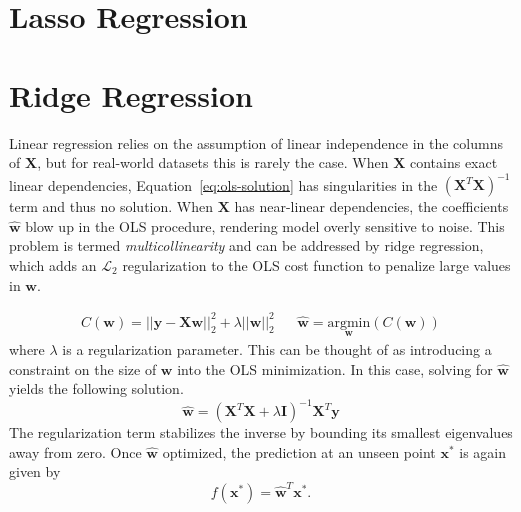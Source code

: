 \documentclass[11pt]{article}
\begin{document}
\section{Lasso Regression}
\newpage
\section*{Ridge Regression} 
Linear regression relies on the assumption of linear independence in the
columns of $\mathbf{X}$, but for real-world datasets this is rarely the case.
When $\mathbf{X}$ contains exact linear dependencies,
Equation~\ref{eq:ols-solution} has singularities in the
$(\mathbf{X}^T\mathbf{X})^{-1}$ term and thus no solution.  
When $\mathbf{X}$ has near-linear dependencies, the coefficients
$\hat{\mathbf{w}}$ blow up in the OLS procedure, rendering model overly
sensitive to noise. 
This problem is termed {\it multicollinearity} and can be addressed by ridge
regression, which adds an $\mathcal{L}_2$ regularization to the OLS cost
function to penalize large values in $\mathbf{w}$.

\begin{align}
	C(\mathbf{w}) 
= 
	|| 
		\mathbf{y} 
	- 
		\mathbf{X} 
		\mathbf{w} 
	||_2^2 
+ 
	\lambda 
	|| 
	\mathbf{w}
	||_2^2 
&& 
	\hat{\mathbf{w}} 
=
	\underset{
				\mathbf{w}
			}
			{
					\mathrm{argmin}
			}
	(C(\mathbf{w})) 
\end{align} 
where $\lambda$ is a regularization parameter.  
This can be thought of as introducing a constraint on the size of $\mathbf{w}$
into the OLS minimization.
In this case, solving for $\mathbf{\hat{w}}$ yields the following solution.
\begin{equation} \label{eq:ridge-solution} \mathbf{\hat{w}} = ( \mathbf{X}^T
\mathbf{X} + \lambda \mathbf{I})^{-1} \mathbf{X}^T\mathbf{y} \end{equation} The
regularization term stabilizes the inverse by bounding its smallest eigenvalues
away from zero.
Once $\mathbf{\hat{w}}$ optimized, the prediction at an unseen point
$\mathbf{x^*}$ is again given by
\begin{equation}
	f(\mathbf{x^*}) = \mathbf{\hat{w}}^T\mathbf{x^*}.
\end{equation}
\end{document}
